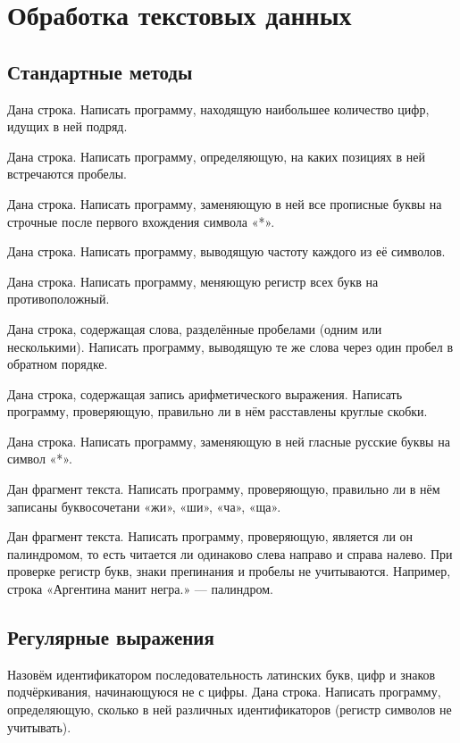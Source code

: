 \section{Обработка текстовых данных}

\subsection{Стандартные методы}

\task Дана строка. Написать программу, находящую наибольшее количество
цифр, идущих в ней подряд.

\task Дана строка. Написать программу, определяющую, на каких позициях
в ней встречаются пробелы.

\task Дана строка. Написать программу, заменяющую в ней все прописные
буквы на строчные после первого вхождения символа «*».

\task Дана строка. Написать программу, выводящую частоту каждого из её
символов.

\task Дана строка. Написать программу, меняющую регистр всех букв на
противоположный.

\task Дана строка, содержащая слова, разделённые пробелами (одним или
несколькими). Написать программу, выводящую те же слова через один
пробел в обратном порядке.

\task Дана строка, содержащая запись арифметического
выражения. Написать программу, проверяющую, правильно ли в нём
расставлены круглые скобки.

\task Дана строка. Написать программу, заменяющую в ней гласные
русские буквы на символ «*».

\task Дан фрагмент текста. Написать программу, проверяющую, правильно
ли в нём записаны буквосочетани «жи», «ши», «ча», «ща».

\task Дан фрагмент текста. Написать программу, проверяющую, является
ли он палиндромом, то есть читается ли одинаково слева направо и
справа налево. При проверке регистр букв, знаки препинания и пробелы
не учитываются. Например, строка «Аргентина манит негра.» — палиндром.

\subsection{Регулярные выражения}


\task Назовём идентификатором последовательность латинских букв, цифр и знаков подчёркивания, начинающуюся не с цифры. Дана строка. Написать программу, определяющую, сколько в ней различных идентификаторов (регистр символов не учитывать).

